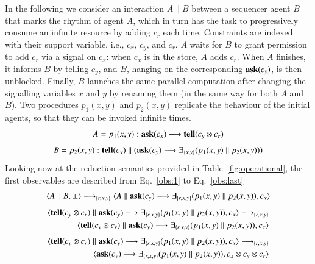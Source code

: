 \documentclass[main.tex]{subfiles}
\begin{document}
\begin{example} In the following we consider an interaction $A \parallel B$ between a sequencer agent $B$ that marks the rhythm of agent $A$, which in turn has the task to progressively consume an infinite resource by adding $c_r$ each time. Constraints are indexed with their support variable, i.e., $c_x$, $c_y$, and $c_r$. $A$ waits for $B$ to grant permission to add $c_r$ via a signal on $c_x$: when $c_x$ is in the store, $A$ adds $c_r$. When $A$ finishes, it informs $B$ by telling $c_y$, and $B$, hanging on the corresponding ${\bf ask}(c_y)$, is then unblocked. Finally, $B$ launches the same parallel computation after changing the signalling variables $x$ and $y$ by renaming them (in the same way for both $A$ and $B$). Two procedures $p_1(x,y)$ and $p_2(x,y)$ replicate the behaviour of the initial agents, so that they can be invoked infinite times.
 \[A = p_1(x,y): {\bf ask}(c_x) \longrightarrow {\bf tell}(c_y \otimes c_r)\]
 \[B = p_2(x,y): {\bf tell}(c_x) \parallel ({\bf ask}(c_y) \longrightarrow \exists_{\{x,y\}} (p_1(x,y) \parallel p_2(x,y)))\]
 Looking now at the reduction semantics provided in Table~\ref{fig:operational}, the first observables are described from Eq.~\ref{obs:1} to 
 Eq.~\ref{obs:last}
 \begin{equation}\label{obs:1}
 \langle A \parallel B, \bot \rangle \longrightarrow_{\{r,x,y\}} \langle A \parallel {\bf ask}(c_y) \longrightarrow \exists_{\{r,x,y\}} (p_1(x,y) \parallel p_2(x,y)), c_x \rangle
 \end{equation}
 \begin{equation}
 \begin{split}
 \langle {\bf tell}(c_y \otimes c_r) \parallel {\bf ask}(c_y) \longrightarrow \exists_{\{r,x,y\}} (p_1(x,y) \parallel p_2(x,y)), c_x\rangle \longrightarrow_{\{r,x,y\}}\\ \langle {\bf tell}(c_y \otimes c_r) \parallel 
  {\bf ask}(c_y) \longrightarrow \exists_{\{r,x,y\}} (p_1(x,y) \parallel p_2(x,y)), c_x\rangle
 \end{split}
 \end{equation}
  \begin{equation}
  \begin{split}
  \langle {\bf tell}(c_y \otimes c_r) \parallel {\bf ask}(c_y) \longrightarrow \exists_{\{r,x,y\}} (p_1(x,y) \parallel p_2(x,y)), c_x \rangle \longrightarrow_{\{r,x,y\}}\\ \langle {\bf ask}(c_y) \longrightarrow \exists_{\{r,x,y\}} (p_1(x,y) \parallel p_2(x,y)), c_x \otimes c_y \otimes c_r\rangle
  \end{split}
  \end{equation}

\end{example}
\end{document}
